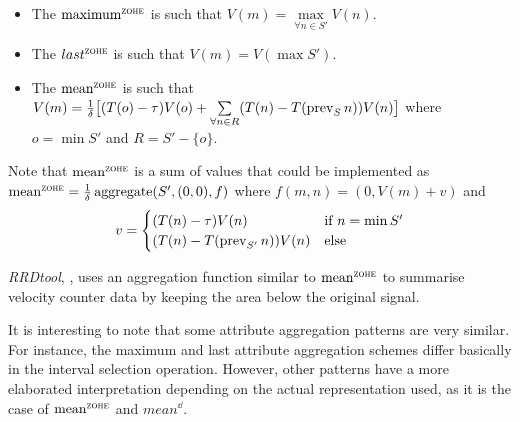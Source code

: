 \begin{itemize}

\item The $\maxz$ is such that $V(m) = \max\limits_{\forall n \in S'}
  V(n)$.

\item The $last^\zohe{}$ is such that $V(m) = V(\max S')$.

\item The $\meanz$ is such that $V(m) = \frac{1}{\delta}
  \big[(T(o)-\tau)V(o) + \sum\limits_{\forall n\in R}( T(n)-
  T(\operatorname*{prev}_S n) )V(n)\big]$ where $o=\min S'$ and $R= S' - \{o\}$.

\end{itemize}

Note that $\meanz$ is a sum of values that could be implemented as
$\meanz = \frac{1}{\delta}\agg(S',(0,0),f)$ where $f(m,n)=(0,V(m)+v)$
and
\[
 v=
 \begin{cases}
   (T(n)-\tau)V(n) & \text{if } n=\min S'\\
   (T(n)-T(\operatorname*{prev}_{S'} n))V(n) & \text{else }
 \end{cases}
\]

\emph{RRDtool}, \cite{rrdtool}, uses an aggregation function similar
to $\meanz$ to summarise velocity counter data by keeping the area
below the original signal.

It is interesting to note that some attribute aggregation patterns are
very similar. For instance, the maximum and last attribute aggregation
schemes differ basically in the interval selection operation. However,
other patterns have a more elaborated interpretation depending on the
actual representation used, as it is the case of $\meanz$ and
$mean^\dd$.


